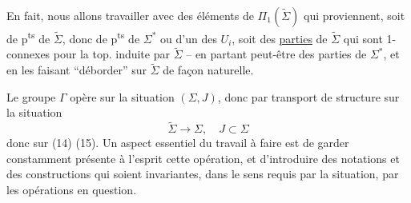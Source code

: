 En fait, nous allons travailler avec des éléments de $\Pi_1(\widetilde\Sigma)$ qui proviennent, soit de p\textsuperscript{ts} de $\widetilde\Sigma$, donc de p\textsuperscript{ts} de $\Sigma^*$ ou d'un des $U_i$, soit des \uline{parties} de $\widetilde\Sigma$ qui sont 1-connexes pour la top. induite par $\widetilde\Sigma$ -- en partant peut-être des parties  de $\Sigma^*$, et en les faisant ``déborder'' sur $\widetilde\Sigma$ de façon naturelle.

Le groupe $\Gamma$ opère sur la situation  $(\Sigma,J)$, donc par transport de structure sur la situation
\[
\widetilde\Sigma\longrightarrow\Sigma,\quad J\subset\Sigma
\]
donc sur  (14) (15). Un aspect essentiel du travail à faire est de garder  constamment présente à l'esprit cette opération, et d'introduire des notations et des constructions qui soient invariantes, dans le sens requis par la situation, par les opérations en question.
